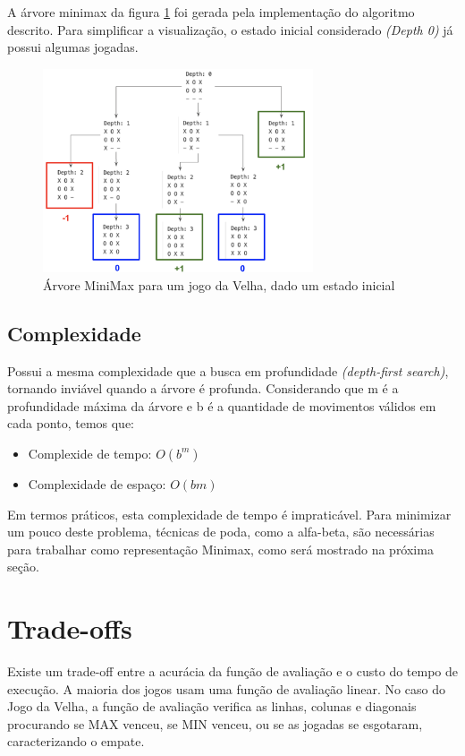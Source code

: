 \documentclass[sigplan,screen]{acmart}
\begin{document}
A árvore minimax da figura \ref{tictactoe} foi gerada pela implementação do algoritmo descrito. 
Para simplificar a visualização, o estado inicial considerado {\itshape(Depth 0)} já possui algumas jogadas.

\begin{figure}[h]
  \includegraphics[width=8cm]{minimax_tree_1.png}
  \caption{Árvore MiniMax para um jogo da Velha, dado um estado inicial}
  \label{tictactoe}
\end{figure}

\subsection{Complexidade}

Possui a mesma complexidade que a busca em profundidade {\itshape (depth-first search)}, tornando inviável quando a árvore é profunda.
Considerando que m é a profundidade máxima da árvore e b é a quantidade de movimentos válidos em cada ponto, temos que:
\begin{itemize}
  \item Complexide de tempo: $O(b^m)$
  \item Complexidade de espaço: $O(bm)$
\end{itemize}

Em termos práticos, esta complexidade de tempo é impraticável.
Para minimizar um pouco deste problema, técnicas de poda, como a alfa-beta, são necessárias para trabalhar como representação Minimax, como será mostrado na próxima seção.


\section{Trade-offs}

Existe um trade-off entre a acurácia da função de avaliação e o custo do tempo de execução.  A maioria dos jogos usam uma função de avaliação linear.
No caso do Jogo da Velha, a função de avaliação verifica as linhas, colunas e diagonais procurando se MAX venceu, se MIN venceu, ou se as jogadas se esgotaram, caracterizando o empate.
\end{document}

